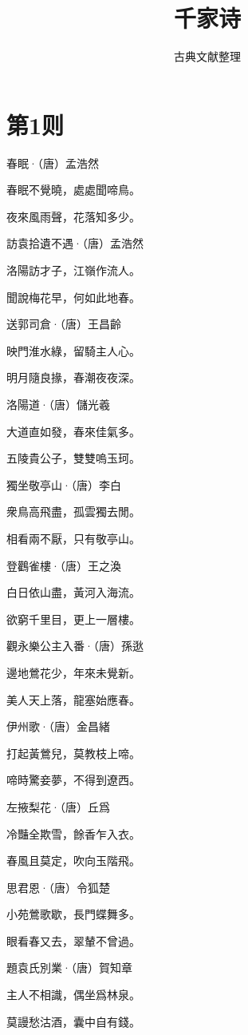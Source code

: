 \documentclass[12pt,a4paper]{ctexbook}
\title{千家诗}
\author{古典文献整理}
\date{}
\begin{document}
\maketitle
\tableofcontents
\newpage
\section{第1则}
春眠·（唐）孟浩然\par
春眠不覺曉，處處聞啼鳥。\par
夜來風雨聲，花落知多少。\par
訪袁拾遺不遇·（唐）孟浩然\par
洛陽訪才子，江嶺作流人。\par
聞說梅花早，何如此地春。\par
送郭司倉·（唐）王昌齡\par
映門淮水綠，留騎主人心。\par
明月隨良掾，春潮夜夜深。\par
洛陽道·（唐）儲光羲\par
大道直如發，春來佳氣多。\par
五陵貴公子，雙雙嗚玉珂。\par
獨坐敬亭山·（唐）李白\par
衆鳥高飛盡，孤雲獨去閒。\par
相看兩不厭，只有敬亭山。\par
登鸛雀樓·（唐）王之渙\par
白日依山盡，黃河入海流。\par
欲窮千里目，更上一層樓。\par
觀永樂公主入番·（唐）孫逖\par
邊地鶯花少，年來未覺新。\par
美人天上落，龍塞始應春。\par
伊州歌·（唐）金昌緒\par
打起黃鶯兒，莫教枝上啼。\par
啼時驚妾夢，不得到遼西。\par
左掖梨花·（唐）丘爲\par
冷豔全欺雪，餘香乍入衣。\par
春風且莫定，吹向玉階飛。\par
思君恩·（唐）令狐楚\par
小苑鶯歌歇，長門蝶舞多。\par
眼看春又去，翠輦不曾過。\par
題袁氏別業·（唐）賀知章\par
主人不相識，偶坐爲林泉。\par
莫謾愁沽酒，囊中自有錢。\par
\end{document}
